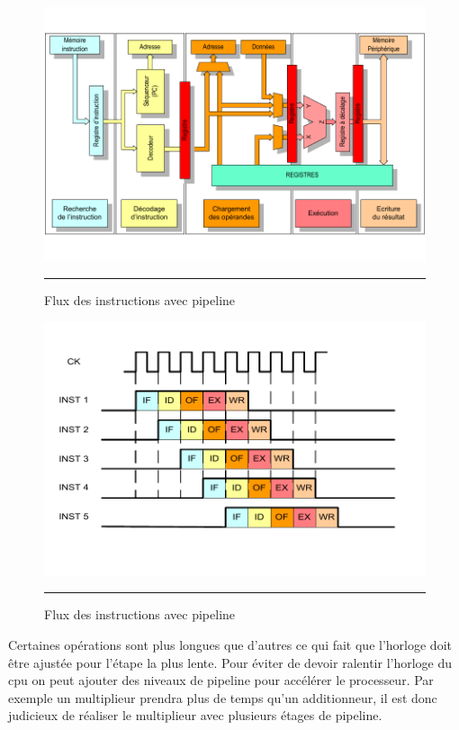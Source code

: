 \begin{figure}[htb]
  \centering
  \includegraphics[angle=0, width=12cm, trim=1 20 1 20,clip]{./Figures/cpu/withpipeline1.pdf}
  \rule{35em}{0.5pt}
  \caption[flux3]{Flux des instructions avec pipeline}
  \label{fig:flux3}
\end{figure}

\begin{figure}[htb]
  \centering
  \includegraphics[angle=0, width=12cm, trim=1 30 1 30,clip]{./Figures/cpu/withpipeline2.pdf}
  \rule{35em}{0.5pt}
  \caption[flux4]{Flux des instructions avec pipeline}
  \label{fig:flux4}
\end{figure}

Certaines opérations sont plus longues que d'autres ce qui fait que l'horloge doit être ajustée pour l'étape la plus lente. Pour éviter de devoir ralentir l'horloge du cpu on peut ajouter des niveaux de pipeline pour accélérer le processeur. Par exemple un multiplieur prendra plus de temps qu'un additionneur, il est donc judicieux de réaliser le multiplieur avec plusieurs étages de pipeline. 


